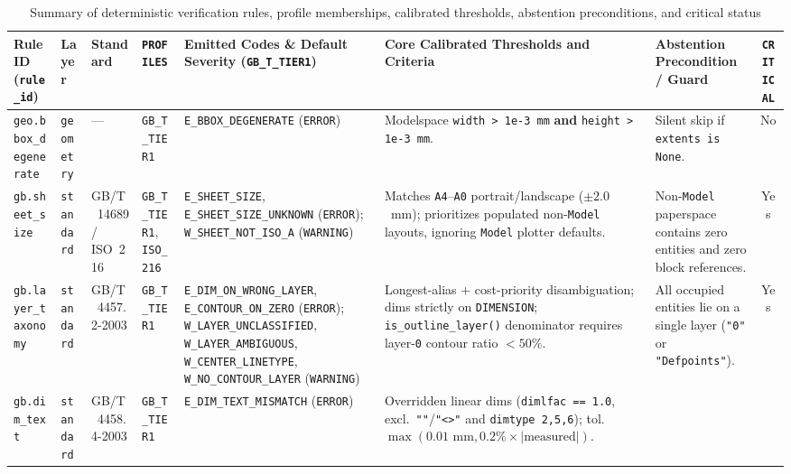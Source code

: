 \documentclass[nocopyright,nolists,upint,varvw,hyphenate]{asmejour}
\begin{document}
\begin{table}[t]
\caption{Summary of deterministic verification rules, profile memberships, calibrated thresholds, abstention preconditions, and critical status}\label{tab:supp_rule_summary}
\centering
\scriptsize
\setlength{\tabcolsep}{2.5pt}
\begin{minipage}{\textwidth}
%
\begin{tabularx}{\textwidth}{L{2.0cm} l L{1.5cm} L{1.6cm} L{2.45cm} Y L{2.3cm} c}
\toprule
Rule ID (\texttt{rule\_id}) & Layer & Standard & \texttt{PROFILES} & Emitted Codes \& Default Severity (\texttt{GB\_T\_TIER1}) & Core Calibrated Thresholds and Criteria & Abstention Precondition / Guard & \texttt{CRITICAL} \\
\midrule
\texttt{geo.bbox\_degenerate} & \texttt{geometry} & --- & \texttt{GB\_T\_TIER1} &
\texttt{E\_BBOX\_DEGENERATE} (\texttt{ERROR}) &
Modelspace \texttt{width > 1e-3~mm} \textbf{and} \texttt{height > 1e-3~mm}. &
Silent skip if \texttt{extents is None}. &
No \\
\addlinespace[2pt]
\texttt{gb.sheet\_size} & \texttt{standard} & GB/T~14689 / ISO~216 & \texttt{GB\_T\_TIER1}, \texttt{ISO\_216} &
\texttt{E\_SHEET\_SIZE}, \texttt{E\_SHEET\_SIZE\_UNKNOWN} (\texttt{ERROR}); \texttt{W\_SHEET\_NOT\_ISO\_A} (\texttt{WARNING}) &
Matches \texttt{A4}--\texttt{A0} portrait/landscape ($\pm 2.0$~mm); prioritizes populated non-\texttt{Model} layouts, ignoring \texttt{Model} plotter defaults. &
Non-\texttt{Model} paperspace contains zero entities and zero block references. &
Yes \\
\addlinespace[2pt]
\texttt{gb.layer\_taxonomy} & \texttt{standard} & GB/T~4457.2-2003 & \texttt{GB\_T\_TIER1} &
\texttt{E\_DIM\_ON\_WRONG\_LAYER}, \texttt{E\_CONTOUR\_ON\_ZERO} (\texttt{ERROR}); \texttt{W\_LAYER\_UNCLASSIFIED}, \texttt{W\_LAYER\_AMBIGUOUS}, \texttt{W\_CENTER\_LINETYPE}, \texttt{W\_NO\_CONTOUR\_LAYER} (\texttt{WARNING}) &
Longest-alias + cost-priority disambiguation; dims strictly on \texttt{DIMENSION}; \texttt{is\_outline\_layer()} denominator requires layer-\texttt{0} contour ratio $< 50\%$. &
All occupied entities lie on a single layer (\texttt{"0"} or \texttt{"Defpoints"}). &
Yes \\
\addlinespace[2pt]
\texttt{gb.dim\_text} & \texttt{standard} & GB/T~4458.4-2003 & \texttt{GB\_T\_TIER1} &
\texttt{E\_DIM\_TEXT\_MISMATCH} (\texttt{ERROR}) &
Overridden linear dims (\texttt{dimlfac == 1.0}, excl.\ \texttt{""}/\texttt{"<>"} and \texttt{dimtype 2,5,6}); tol.\ $\max(0.01\text{~mm}, 0.2\% \times |\text{measured}|)$. &

\end{tabularx}
\end{minipage}
\end{table}
\end{document}
